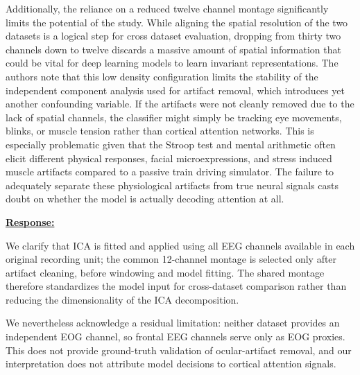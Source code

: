 \documentclass{article}
\begin{document}
\begin{cmt}{}{}

Additionally, the reliance on a reduced twelve channel montage significantly
limits the potential of the study. While aligning the spatial resolution of the
two datasets is a logical step for cross dataset evaluation, dropping from
thirty two channels down to twelve discards a massive amount of spatial
information that could be vital for deep learning models to learn invariant
representations. The authors note that this low density configuration limits the
stability of the independent component analysis used for artifact removal, which
introduces yet another confounding variable. If the artifacts were not cleanly
removed due to the lack of spatial channels, the classifier might simply be
tracking eye movements, blinks, or muscle tension rather than cortical attention
networks. This is especially problematic given that the Stroop test and mental
arithmetic often elicit different physical responses, facial microexpressions,
and stress induced muscle artifacts compared to a passive train driving
simulator. The failure to adequately separate these physiological artifacts from
true neural signals casts doubt on whether the model is actually decoding
attention at all.

\end{cmt}
\vspace{0.1cm}
\noindent
\underline{\textbf{Response:}}
\vspace{0.2cm}

We clarify that ICA is fitted and applied using all EEG channels available in
each original recording unit; the common 12-channel montage is selected only
after artifact cleaning, before windowing and model fitting. The shared montage
therefore standardizes the model input for cross-dataset comparison rather than
reducing the dimensionality of the ICA decomposition.

We nevertheless acknowledge a residual limitation: neither dataset provides an
independent EOG channel, so frontal EEG channels serve only as EOG proxies. This
does not provide ground-truth validation of ocular-artifact removal, and our
interpretation does not attribute model decisions to cortical attention signals.

\vspace{0.3cm}
\end{document}
